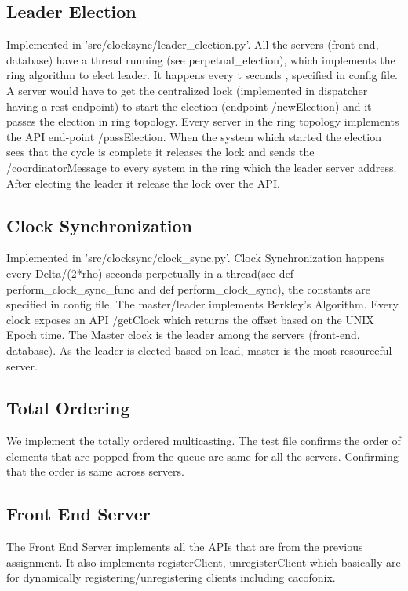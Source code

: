 \documentclass{article}
\begin{document}
\subsection{Leader Election}

Implemented in 'src/clocksync/leader\_election.py'. All the servers (front-end, database) have a thread running (see perpetual\_election), which implements the ring algorithm to elect leader. It happens every t seconds , specified in config file. A server would have to get the centralized lock (implemented in dispatcher having a rest endpoint) to start the election (endpoint /newElection) and it passes the election in ring topology. Every server in the ring topology implements the API end-point /passElection. When the system which started the election sees that the cycle is complete it releases the lock and sends the /coordinatorMessage to every system in the ring which the leader server address. After electing the leader it release the lock over the API.


\subsection{Clock Synchronization}
Implemented in 'src/clocksync/clock\_sync.py'. Clock Synchronization happens every Delta/(2*rho) seconds perpetually in a thread(see def perform\_clock\_sync\_func and def perform\_clock\_sync), the constants are specified in config file. The master/leader implements Berkley's Algorithm. Every clock exposes an API /getClock which returns the offset based on the UNIX Epoch time. The Master clock is the leader among the servers (front-end, database). As the leader is elected based on load, master is the most resourceful server.


\subsection{Total Ordering}
We implement the totally ordered multicasting. The test file confirms the order of elements that are popped from the queue are same for all the servers. Confirming that the order is same across servers.


\subsection{Front End Server}
The Front End Server implements all the APIs that are from the previous assignment. It also implements registerClient, unregisterClient which basically are for dynamically registering/unregistering clients including cacofonix. 
\end{document}
